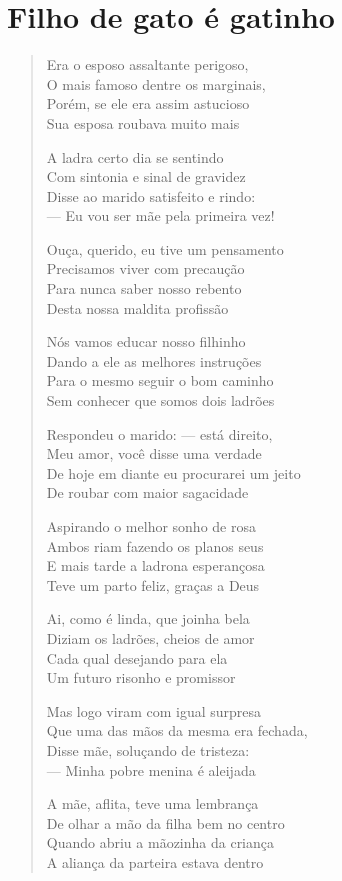 \chapter{Filho de gato é gatinho}

\begin{verse}
Era o esposo assaltante perigoso,\\
O mais famoso dentre os marginais,\\
Porém, se ele era assim astucioso\\
Sua esposa roubava muito mais

A ladra certo dia se sentindo\\
Com sintonia e sinal de gravidez\\
Disse ao marido satisfeito e rindo:\\
--- Eu vou ser mãe pela primeira vez!

Ouça, querido, eu tive um pensamento\\
Precisamos viver com precaução\\
Para nunca saber nosso rebento\\
Desta nossa maldita profissão

Nós vamos educar nosso filhinho\\
Dando a ele as melhores instruções\\
Para o mesmo seguir o bom caminho\\
Sem conhecer que somos dois ladrões

Respondeu o marido: --- está direito,\\
Meu amor, você disse uma verdade\\
De hoje em diante eu procurarei um jeito\\
De roubar com maior sagacidade

Aspirando o melhor sonho de rosa\\
Ambos riam fazendo os planos seus\\
E mais tarde a ladrona esperançosa\\
Teve um parto feliz, graças a Deus

Ai, como é linda, que joinha bela\\
Diziam os ladrões, cheios de amor\\
Cada qual desejando para ela\\
Um futuro risonho e promissor

Mas logo viram com igual surpresa\\
Que uma das mãos da mesma era fechada,\\
Disse mãe, soluçando de tristeza:\\
--- Minha pobre menina é aleijada

A mãe, aflita, teve uma lembrança\\
De olhar a mão da filha bem no centro\\
Quando abriu a mãozinha da criança\\
A aliança da parteira estava dentro
\end{verse}

